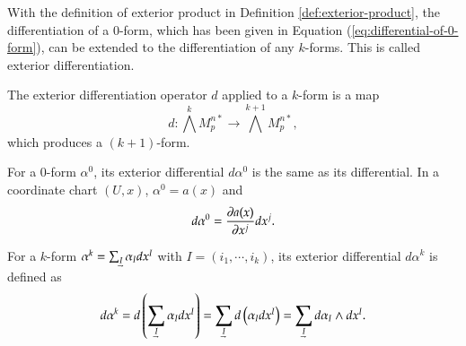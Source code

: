\documentclass[11pt, a4paper]{book}
\begin{document}
With the definition of exterior product in Definition \ref{def:exterior-product}, the
differentiation of a 0-form, which has been given in Equation
(\ref{eq:differential-of-0-form}), can be extended to the differentiation of any
$k$-forms. This is called exterior differentiation.

\begin{Definition}
  The exterior differentiation operator $d$ applied to a $k$-form is a map
  \begin{equation}
    d: \bigwedge^k M_p^{n*} \rightarrow \bigwedge^{k+1} M_p^{n*},
  \end{equation}
  which produces a $(k+1)$-form.

  For a $0$-form $\alpha^0$, its exterior differential $d\alpha^0$ is the same as its
  differential. In a coordinate chart $(U,x)$, $\alpha^0 = a(x)$ and
  \begin{equation}
    d\alpha^{0} = \frac{\partial a(x)}{\partial x^j} dx^j.
  \end{equation}

  For a $k$-form $\alpha^k = \sum_{\underaccent{\rightharpoondown}{I}} \alpha_I dx^I$ with
  $I=(i_1,\cdots,i_k)$, its exterior differential $d\alpha^k$ is defined as
  \begin{equation}
    \label{eq:exterior-diff-k-form}
    d\alpha^k = d \left( \sum_{\underaccent{\rightharpoondown}{I}}\alpha_I dx^I \right) =
    \sum_{\underaccent{\rightharpoondown}{I}} d \left( \alpha_I dx^I \right) =
    \sum_{\underaccent{\rightharpoondown}{I}} d\alpha_I \wedge dx^I.
  \end{equation}
\end{Definition}
\end{document}
